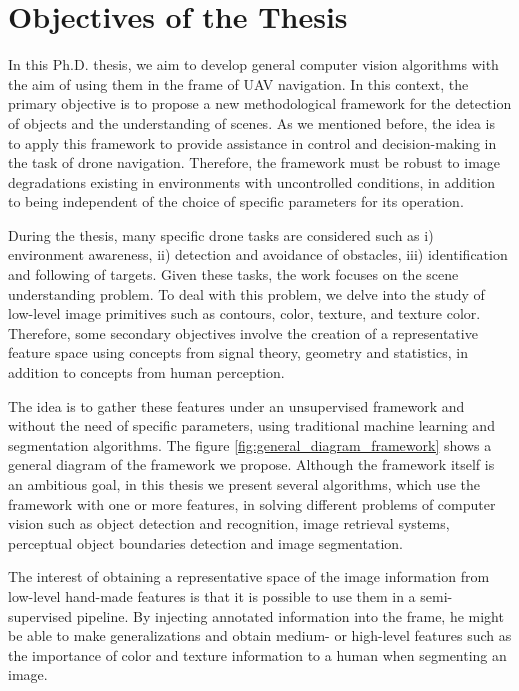 \section*{Objectives of the Thesis}\label{sec:objectives_of_the_thesis}

In this Ph.D. thesis, we aim to develop general computer vision algorithms with the aim of using them in the frame of UAV navigation. In this context, the primary objective is to propose a new methodological framework for the detection of objects and the understanding of scenes. As we mentioned before, the idea is to apply this framework to provide assistance in control and decision-making in the task of drone navigation. Therefore, the framework must be robust to image degradations existing in environments with uncontrolled conditions, in addition to being independent of the choice of specific parameters for its operation.

During the thesis, many specific drone tasks are considered such as i) environment awareness, ii) detection and avoidance of obstacles, iii) identification and following of targets. Given these tasks, the work focuses on the scene understanding problem. To deal with this problem, we delve into the study of low-level image primitives such as contours, color, texture, and texture color. Therefore, some secondary objectives involve the creation of a representative feature space using concepts from signal theory, geometry and statistics, in addition to concepts from human perception.

The idea is to gather these features under an unsupervised framework and without the need of specific parameters, using traditional machine learning and segmentation algorithms. The figure \ref{fig:general_diagram_framework} shows a general diagram of the framework we propose. Although the framework itself is an ambitious goal, in this thesis we present several algorithms, which use the framework with one or more features, in solving different problems of computer vision such as object detection and recognition, image retrieval systems, perceptual object boundaries detection and image segmentation.

The interest of obtaining a representative space of the image information from low-level hand-made features is that it is possible to use them in a semi-supervised pipeline. By injecting annotated information into the frame, he might be able to make generalizations and obtain medium- or high-level features such as the importance of color and texture information to a human when segmenting an image.

